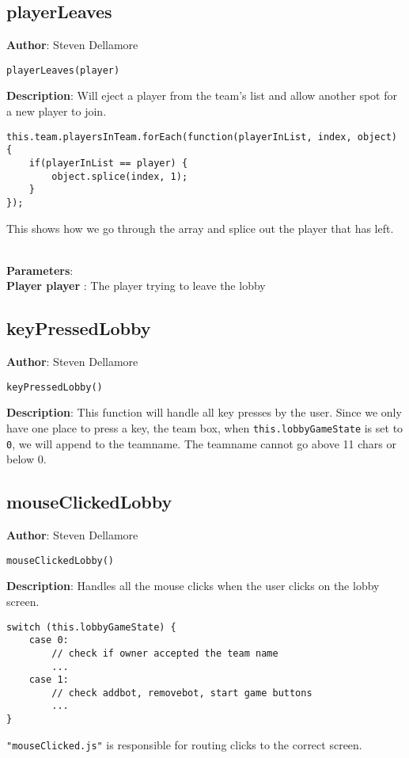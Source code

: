 \documentclass[12pt]{article}
\begin{document}
\subsection{playerLeaves}
\textbf{Author}: Steven Dellamore 
\vspace*{1\baselineskip}
\begin{lstlisting}
playerLeaves(player)
\end{lstlisting} 
\vspace*{1\baselineskip}
\textbf{Description}: Will eject a player from the team's list and allow another spot for a new player to join. 
\begin{verbatim}
this.team.playersInTeam.forEach(function(playerInList, index, object) {
    if(playerInList == player) {
        object.splice(index, 1);
    }
});
\end{verbatim}
 This shows how we go through the array and splice out the player that has left. 


\textbf{\large{\\Parameters}}:\\
\textbf{Player player }: The player trying to leave the lobby\\

\subsection{keyPressedLobby}
\textbf{Author}: Steven Dellamore 
\vspace*{1\baselineskip}
\begin{lstlisting}
keyPressedLobby()
\end{lstlisting} 
\vspace*{1\baselineskip}
\textbf{Description}: This function will handle all key presses by the user. Since we only have one place to press a key, the team box, when \texttt{this.lobbyGameState} is set to \texttt{0}, we will append to the teamname. The teamname cannot go above 11 chars or below 0. 



\subsection{mouseClickedLobby}
\textbf{Author}: Steven Dellamore 
\vspace*{1\baselineskip}
\begin{lstlisting}
mouseClickedLobby()
\end{lstlisting} 
\vspace*{1\baselineskip}
\textbf{Description}: Handles all the mouse clicks when the user clicks on the lobby screen. 
\begin{verbatim}
switch (this.lobbyGameState) {
    case 0:
        // check if owner accepted the team name
        ...
    case 1: 
        // check addbot, removebot, start game buttons
        ...
}
\end{verbatim}
 \texttt{"mouseClicked.js"} is responsible for routing clicks to the correct screen. 
\end{document}

